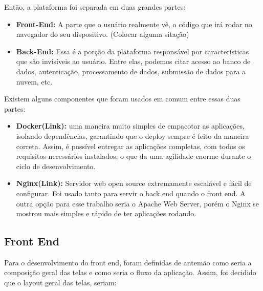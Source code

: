 \documentclass[11pt,twoside]{article}
\begin{document}
Então, a plataforma foi separada em duas grandes partes:

\begin{itemize}
  \item \textbf{Front-End:} A parte que o usuário realmente vê, o código que irá rodar no navegador do seu dispositivo. (Colocar alguma sitação)
  \item \textbf{Back-End:} Essa é a porção da plataforma responsável por características que são invisíveis ao usuário. Entre elas, podemos citar acesso ao banco de dados, autenticação, processamento de dados,
  submissão de dados para a nuvem, etc.
\end{itemize}

Existem alguns componentes que foram usados em comum entre essas duas partes:

\begin{itemize}
  \item \textbf{Docker(Link):} uma maneira muito simples de empacotar as aplicações, isolando dependências, garantindo que o deploy sempre é feito da maneira correta. Assim, é possível entregar as aplicações completas, com
  todos os requisitos necessários instalados, o que da uma agilidade enorme durante o ciclo de desenvolvimento.
  \item \textbf{Nginx(Link):} Servidor web open source extremamente escalável e fácil de configurar. Foi usado tanto para servir o back end quando o front end. A outra opção para esse trabalho seria o Apache Web Server, porém
  o Nginx se mostrou mais simples e rápido de ter aplicações rodando.
\end{itemize}

\subsection{Front End}

Para o desenvolvimento do front end, foram definidas de antemão como seria a composição geral das telas e como seria o fluxo da aplicação. Assim, foi decidido que o layout geral das telas, seriam:
\end{document}
